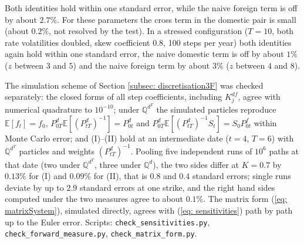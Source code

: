 \noindent Both identities hold within one standard error, while the naive foreign term is off by about $2.7\%$. For these parameters the cross term in the domestic pair is small (about $0.2\%$, not resolved by the test). In a stressed configuration ($T=10$, both rate volatilities doubled, skew coefficient $0.8$, 100 steps per year) both identities again hold within one standard error, the naive domestic term is off by about $1\%$ ($z$ between $3$ and $5$) and the naive foreign term by about $3\%$ ($z$ between $4$ and $8$).

The simulation scheme of Section \ref{subsec: discretisation3F} was checked separately: the closed forms of all step coefficients, including $K^{df}_j$, agree with numerical quadrature to $10^{-10}$; under $\mathbb{Q}^{d^T}$ the simulated particles reproduce $\mathbb{E}[f_t]=f_0$, $P^d_{0T}\mathbb{E}[(P^d_{tT})^{-1}]=P^d_{0t}$ and $P^d_{0T}\mathbb{E}[(P^d_{tT})^{-1}S_t]=S_0P^f_{0t}$ within Monte Carlo error; and (I)--(II) hold at an intermediate date ($t=4$, $T=6$) with $\mathbb{Q}^{d^T}$ particles and weights $(P^d_{tT})^{-1}$. Pooling five independent runs of $10^6$ paths at that date (two under $\mathbb{Q}^{d^T}$, three under $\mathbb{Q}^d$), the two sides differ at $K=0.7$ by $0.13\%$ for (I) and $0.09\%$ for (II), that is $0.8$ and $0.4$ standard errors; single runs deviate by up to $2.9$ standard errors at one strike, and the right hand sides computed under the two measures agree to about $0.1\%$.
The matrix form (\ref{eq: matrixSystem}), simulated directly, agrees with (\ref{eq: sensitivities}) path by path up to the Euler error. Scripts: \texttt{check\_sensitivities.py}, \texttt{check\_forward\_measure.py}, \texttt{check\_matrix\_form.py}.

